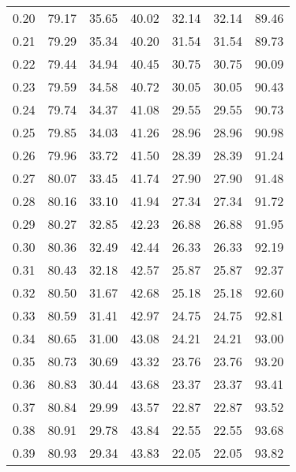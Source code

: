 \begin{tabular}{|c|c|c|c|c|c|c|}
      0.20 &     79.17 &     35.65 &      40.02 &   32.14 &      32.14 &         89.46 \\
      0.21 &     79.29 &     35.34 &      40.20 &   31.54 &      31.54 &         89.73 \\
      0.22 &     79.44 &     34.94 &      40.45 &   30.75 &      30.75 &         90.09 \\
      0.23 &     79.59 &     34.58 &      40.72 &   30.05 &      30.05 &         90.43 \\
      0.24 &     79.74 &     34.37 &      41.08 &   29.55 &      29.55 &         90.73 \\
      0.25 &     79.85 &     34.03 &      41.26 &   28.96 &      28.96 &         90.98 \\
      0.26 &     79.96 &     33.72 &      41.50 &   28.39 &      28.39 &         91.24 \\
      0.27 &     80.07 &     33.45 &      41.74 &   27.90 &      27.90 &         91.48 \\
      0.28 &     80.16 &     33.10 &      41.94 &   27.34 &      27.34 &         91.72 \\
      0.29 &     80.27 &     32.85 &      42.23 &   26.88 &      26.88 &         91.95 \\
      0.30 &     80.36 &     32.49 &      42.44 &   26.33 &      26.33 &         92.19 \\
      0.31 &     80.43 &     32.18 &      42.57 &   25.87 &      25.87 &         92.37 \\
      0.32 &     80.50 &     31.67 &      42.68 &   25.18 &      25.18 &         92.60 \\
      0.33 &     80.59 &     31.41 &      42.97 &   24.75 &      24.75 &         92.81 \\
      0.34 &     80.65 &     31.00 &      43.08 &   24.21 &      24.21 &         93.00 \\
      0.35 &     80.73 &     30.69 &      43.32 &   23.76 &      23.76 &         93.20 \\
      0.36 &     80.83 &     30.44 &      43.68 &   23.37 &      23.37 &         93.41 \\
      0.37 &     80.84 &     29.99 &      43.57 &   22.87 &      22.87 &         93.52 \\
      0.38 &     80.91 &     29.78 &      43.84 &   22.55 &      22.55 &         93.68 \\
      0.39 &     80.93 &     29.34 &      43.83 &   22.05 &      22.05 &         93.82 \\

\end{tabular}
